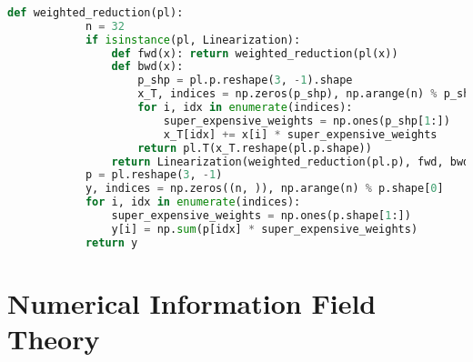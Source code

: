 \documentclass[aspectratio=169,xcolor=dvipsnames]{beamer}
\begin{document}
\begin{frame}[fragile]
	\frametitle{\insertsection}
	\framesubtitle{\insertsubsection}

	\vspace{-1em}
	\begin{lstlisting}[language=python,escapechar=!]
		def weighted_reduction(pl):
			n = 32
			if isinstance(pl, Linearization):
				def fwd(x): return weighted_reduction(pl(x))
				def bwd(x):
					p_shp = pl.p.reshape(3, -1).shape
					x_T, indices = np.zeros(p_shp), np.arange(n) % p_shp[0]
					for i, idx in enumerate(indices):
						super_expensive_weights = np.ones(p_shp[1:])
						x_T[idx] += x[i] * super_expensive_weights
					return pl.T(x_T.reshape(pl.p.shape))
				return Linearization(weighted_reduction(pl.p), fwd, bwd)
			p = pl.reshape(3, -1)
			y, indices = np.zeros((n, )), np.arange(n) % p.shape[0]
			for i, idx in enumerate(indices):
				super_expensive_weights = np.ones(p.shape[1:])
				y[i] = np.sum(p[idx] * super_expensive_weights)
			return y
	\end{lstlisting}
\end{frame}

\section{Numerical Information Field Theory}  %


\end{document}

